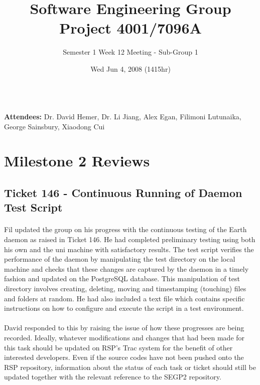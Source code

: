 \documentclass[10pt, a4]{article}
\begin{document}
\title{Software Engineering Group Project 4001/7096A}
\author{Semester 1 Week 12 Meeting - Sub-Group 1}
\date{Wed Jun 4, 2008 (1415hr)}

\maketitle
 
\\
 
\noindent \textbf{Attendees:} Dr. David Hemer, Dr. Li Jiang, Alex Egan, 
Filimoni Lutunaika, George Sainsbury, Xiaodong Cui\\

\section{Milestone 2 Reviews}

\subsection{Ticket 146 - Continuous Running of Daemon Test Script}

\paragraph{}Fil updated the group on his progress with the continuous 
testing of the Earth daemon as raised in Ticket 146. He had completed
preliminary testing using both his own and the uni machine with satisfactory 
results. The test script verifies the performance of the daemon by 
manipulating the test directory on the local machine and checks that 
these changes are captured by the daemon in a timely fashion and updated 
on the PostgreSQL database. This manipulation of test directory involves 
creating, deleting, moving and timestamping (touching) files and folders at 
random. He had also included a text file which contains specific 
instructions on how to configure and execute the script in a test environment.

\paragraph{} David responded to this by raising the issue of how these 
progresses are being recorded. Ideally, whatever modifications and changes 
that had been made for this task should be updated on RSP's Trac system
for the benefit of other interested developers. Even if the source codes 
have not been pushed onto the RSP repository, information about the status
of each task or ticket should still be updated together with the relevant 
reference to the SEGP2 repository.
\end{document}
